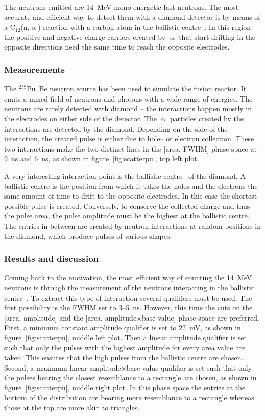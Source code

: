 The neutrons emitted are 14~MeV mono-energetic fast neutrons. The most accurate and efficient way to detect them with a diamond detector is by means of a C$_\mathrm{12}$(n,$\upalpha$) reaction with a carbon atom in the ballistic centre~\cite{PAVEL:00001}. In this region the positive and negative charge carriers created by $\upalpha$ that start drifting in the opposite directions need the same time to reach the opposite electrodes.

\subsubsection{Measurements}
The $^{239}$Pu~Be neutron source has been used to simulate the fusion reactor. It emits a mixed field of neutrons and photons with a wide range of energies. The neutrons are rarely detected with diamond -- the interactions happen mostly in the electrodes on either side of the detector. The $\upalpha$ particles created by the interactions are detected by the diamond. Depending on the side of the interaction, the created pulse is either due to hole-- or electron collection. These two interactions make the two distinct lines in the [area, FWHM] phase space at 9~ns and 6~ns, as shown in figure~\ref{fig:scatterpu}, top left plot. 

A very interesting interaction point is the ballistic centre~\cite{CHRISSI:00001} of the diamond. A ballistic centre is the position from which it takes the holes and the electrons the same amount of time to drift to the opposite electrodes. In this case the shortest possible pulse is created. Conversely, to conserve the collected charge and thus the pulse area, the pulse amplitude must be the highest at the ballistic centre. The entries in between are created by neutron interactions at random positions in the diamond, which produce pulses of various shapes. 

\subsubsection{Results and discussion}
Coming back to the motivation, the most efficient way of counting the 14~MeV neutrons is through the measurement of the neutrons interacting in the ballistic centre~\cite{????}. To extract this type of interaction several qualifiers must be used. The first possibility is the FWHM set to 3--5~ns. However, this time the cuts on the [area, amplitude] and the [area, amplitude$\times$base value] phase space are preferred. First, a minimum constant amplitude qualifier is set to 22~mV, as shown in figure~\ref{fig:scatterpu}, middle left plot. Then a linear amplitude qualifier is set such that only the pulses with the highest amplitude for every area value are taken. This ensures that the high pulses from the ballistic centre are chosen. Second, a maximum linear amplitude$\times$base value qualifier is set such that only the pulses bearing the closest resemblance to a rectangle are chosen, as shown in figure~\ref{fig:scatterpu}, middle right plot. In this phase space the entries at the bottom of the distribution are bearing more resemblance to a rectangle whereas those at the top are more akin to triangles.

